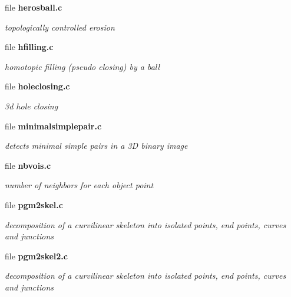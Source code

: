 \begin{CompactItemize}
\item 
file \bf{herosball.c}
\begin{CompactList}\small\item\em topologically controlled erosion \item\end{CompactList}

\item 
file \bf{hfilling.c}
\begin{CompactList}\small\item\em homotopic filling (pseudo closing) by a ball \item\end{CompactList}

\item 
file \bf{holeclosing.c}
\begin{CompactList}\small\item\em 3d hole closing \item\end{CompactList}

\item 
file \bf{minimalsimplepair.c}
\begin{CompactList}\small\item\em detects minimal simple pairs in a 3D binary image \item\end{CompactList}

\item 
file \bf{nbvois.c}
\begin{CompactList}\small\item\em number of neighbors for each object point \item\end{CompactList}

\item 
file \bf{pgm2skel.c}
\begin{CompactList}\small\item\em decomposition of a curvilinear skeleton into isolated points, end points, curves and junctions \item\end{CompactList}

\item 
file \bf{pgm2skel2.c}
\begin{CompactList}\small\item\em decomposition of a curvilinear skeleton into isolated points, end points, curves and junctions \item\end{CompactList}


\end{CompactItemize}

